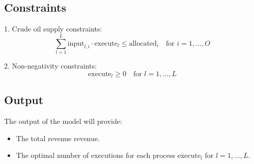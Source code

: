\documentclass{article}
\begin{document}
\subsection*{Constraints}
1. Crude oil supply constraints:
\[
\sum_{l=1}^{L} \text{input}_{l,i} \cdot \text{execute}_l \leq \text{allocated}_i \quad \text{for } i = 1, \ldots, O 
\]

2. Non-negativity constraints:
\[
\text{execute}_l \geq 0 \quad \text{for } l = 1, \ldots, L
\]

\subsection*{Output}
The output of the model will provide:
\begin{itemize}
    \item The total revenue \( \text{revenue} \).
    \item The optimal number of executions for each process \( \text{execute}_l \) for \( l = 1, \ldots, L \).
\end{itemize}
\end{document}
